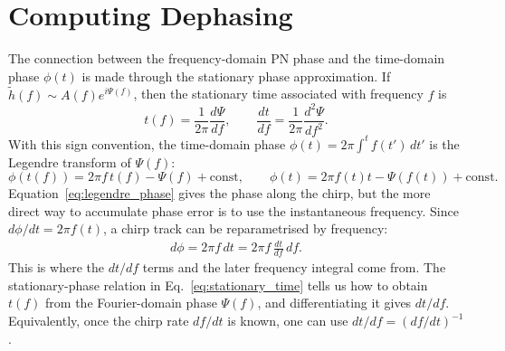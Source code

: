 \documentclass[11pt]{article}
\begin{document}
\section{Computing Dephasing}
The connection between the frequency-domain PN phase and the time-domain phase $\phi(t)$
is made through the stationary phase approximation. If
$\tilde h(f)\sim A(f)e^{i\Psi(f)}$, then the stationary time associated with
frequency $f$ is
\begin{equation}
    t(f)
    =
    \frac{1}{2\pi}\frac{d\Psi}{df},
    \qquad
    \frac{dt}{df}
    =
    \frac{1}{2\pi}\frac{d^2\Psi}{df^2} .
    \label{eq:stationary_time}
\end{equation}
With this sign convention, the time-domain phase
$\phi(t)=2\pi\int^t f(t')\,dt'$ is the Legendre transform of $\Psi(f)$:
\begin{equation}
    \phi(t(f))
    =
    2\pi f\,t(f)-\Psi(f)+\mathrm{const},
    \qquad
    \phi(t)
    =
    2\pi f(t)t-\Psi(f(t))+\mathrm{const}.
    \label{eq:legendre_phase}
\end{equation}
Equation~\eqref{eq:legendre_phase} gives the phase along the chirp, but the
more direct way to accumulate phase error is to use the instantaneous
frequency. Since $d\phi/dt=2\pi f(t)$, a chirp track can be reparametrised by
frequency:
\begin{gather}
    d\phi = 2\pi f\,dt
    =
    2\pi f\,\frac{dt}{df}\,df .
\end{gather}
This is where the $dt/df$ terms and the later frequency integral come from.
The stationary-phase relation in Eq.~\eqref{eq:stationary_time} tells us how
to obtain $t(f)$ from the Fourier-domain phase $\Psi(f)$, and differentiating
it gives $dt/df$. Equivalently, once the chirp rate $df/dt$ is known, one can
use $dt/df=(df/dt)^{-1}$.
\end{document}
